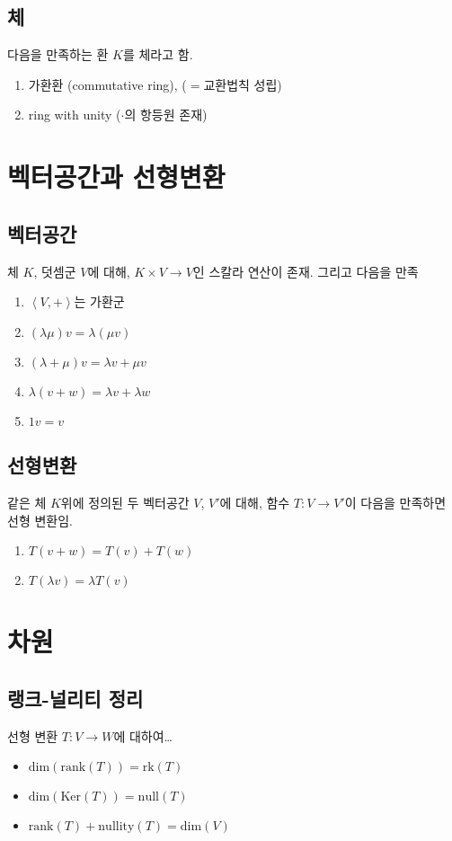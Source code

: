 \documentclass[oneside]{oblivoir}
\begin{document}
\subsection{체}
다음을 만족하는 환 $K$를 체라고 함.
\begin{enumerate}
    \item 가환환 (commutative ring), ($=$교환법칙 성립)
    \item ring with unity ($\cdot$의 항등원 존재)
\end{enumerate}


\section{벡터공간과 선형변환}
\subsection{벡터공간}
체 $K$, 덧셈군 $V$에 대해,
 $K \times V \to V$인 스칼라 연산이 존재.
 그리고 다음을 만족
\begin{enumerate}
    \item $\left\langle  V,+ \right\rangle$는 가환군
    \item $(\lambda \mu)v = \lambda(\mu v) $
    \item $(\lambda + \mu) v =\lambda v + \mu v$
    \item $\lambda (v + w) = \lambda v + \lambda w$
    \item $1 v = v$
\end{enumerate}

\subsection{선형변환}
같은 체 $K$위에 정의된 두 벡터공간 $V$, $V'$에 대해,
함수 $T : V \to V'$이 다음을 만족하면 선형 변환임.
\begin{enumerate}
    \item $T(v+w) = T(v)+T(w)$
    \item $T(\lambda v) = \lambda T(v)$
\end{enumerate}

\section{차원}
\subsection{랭크-널리티 정리}
선형 변환 $T : V \to W$에 대하여\dots
\begin{itemize}
    \item $\mathrm{dim} (\mathrm{rank} (T)) = \mathrm{rk} (T)$
    \item $\mathrm{dim} (\mathrm{Ker} (T)) = \mathrm{null} (T)$
    \item $\mathrm{rank} (T)+\mathrm{nullity} (T)= \mathrm{dim} (V)$
\end{itemize}
\end{document}
